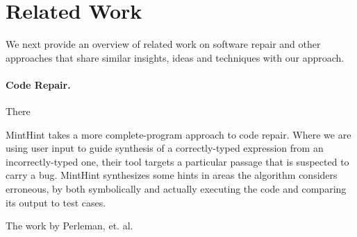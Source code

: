 \section{Related Work}
\label{sec:related}

We next provide an overview of related work on software repair and other approaches
that share similar insights, ideas and techniques with our approach.

\paragraph{{\bf Code Repair.}} There


MintHint \citep{MintHint} takes a more complete-program approach to code repair. Where we are using user input to guide synthesis of a correctly-typed expression from an incorrectly-typed one, their tool targets a particular passage that is suspected to carry a bug. MintHint synthesizes some hints in areas the algorithm considers erroneous, by both symbolically and actually executing the code and comparing its output to test cases.

The work by Perleman, et. al. \cite{PerelmanGBG12}




\vspace{-0.5em}
